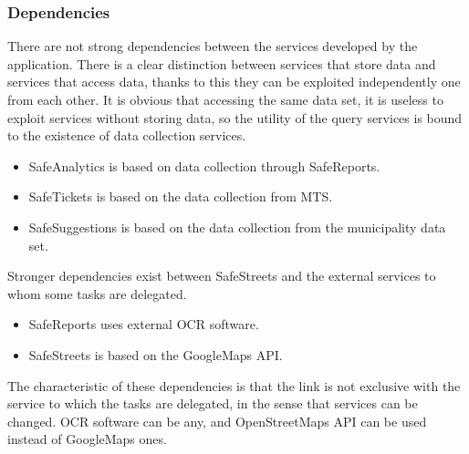 \documentclass[./main.tex]{subfiles}
\begin{document}
\subsubsection{Dependencies}

There are not strong dependencies between the services developed by the
application. There is a clear distinction between services that store
data and services that access data, thanks to this they can be exploited
independently one from each other. It is obvious that accessing the same
data set, it is useless to exploit services without storing data, so the
utility of the query services is bound to the existence of data
collection services.

\begin{itemize}
\item
  SafeAnalytics is based on data collection through SafeReports.
\item
  SafeTickets is based on the data collection from MTS.
\item
  SafeSuggestions is based on the data collection from the municipality
  data set.
\end{itemize}

Stronger dependencies exist between SafeStreets and the external
services to whom some tasks are delegated.

\begin{itemize}
\item
  SafeReports uses external OCR software.
\item
  SafeStreets is based on the GoogleMaps API.
\end{itemize}

The characteristic of these dependencies is that the link is not
exclusive with the service to which the tasks are delegated, in the
sense that services can be changed. OCR software can be any, and
OpenStreetMaps API can be used instead of GoogleMaps ones.
\end{document}
